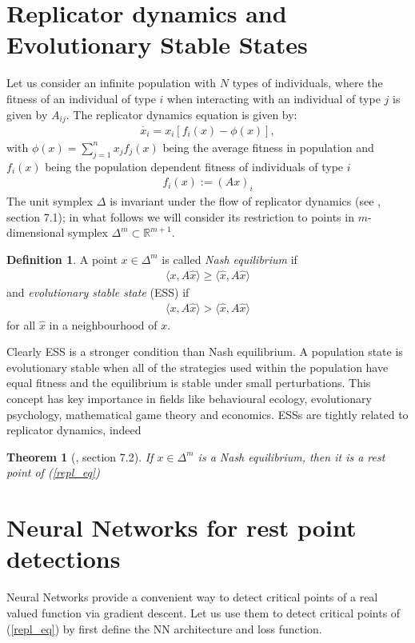 \documentclass[12pt,a4paper,twoside]{article}
\theoremstyle{plain}
\newtheorem{thm}{Theorem}
\theoremstyle{definition}
\newtheorem*{defin*}{Definition}
\theoremstyle{remark}
\begin{document}
\section*{Replicator dynamics and Evolutionary Stable States}
Let us consider an infinite population with $N$ types of individuals, where the fitness of an individual of type $i$ when interacting with an individual of type $j$ is given by $A_{ij}$.
The replicator dynamics equation is given by:
\begin{align}
\dot {x_i}=x_{i}[f_i(x)-\phi (x)], \label{repl_eq}\tag{RE}
\end{align}
with $\phi (x)=\sum _{j=1}^{n}{x_j f_j(x)}$ being the average fitness in population and $f_i(x)$
being the population dependent fitness of individuals of type $i$
\begin{align*}
f_i(x) := (Ax)_i
\end{align*}
The unit symplex $\Delta$ is invariant under the flow of replicator dynamics (see \cite{HS98}, section 7.1); in what follows we will consider its restriction to points in $m$-dimensional symplex $\Delta^m \subset \mathbb{R}^{m+1}$.


\begin{defin*}A point $x \in \Delta^m$ is called \textit{Nash equilibrium} if
\begin{align*}
\langle x, A \hat{x} \rangle \geq \langle \hat{x}, A\hat{x} \rangle
\end{align*}
and \textit{evolutionary stable state} (ESS) if
\begin{align*}
\langle x, A \hat{x} \rangle > \langle \hat{x}, A\hat{x} \rangle
\end{align*}
for all $\hat{x}$ in a neighbourhood of $x$. 
\end{defin*}
Clearly ESS is a stronger condition than Nash equilibrium. A population state is evolutionary stable  %
when all of the strategies used within the population have equal fitness and the equilibrium is stable under small perturbations. This concept has key importance in fields like behavioural ecology, evolutionary psychology, mathematical game theory and economics.
ESSs are tightly related to replicator dynamics, indeed  
\begin{thm}[\cite{HS98}, section 7.2] If $x \in \Delta^m$ is a Nash equilibrium, then it is a rest point of (\ref{repl_eq}) 
\end{thm}


\section*{Neural Networks for rest point detections}
Neural Networks provide a convenient way to detect critical points of a real valued function via gradient descent. Let us use them to detect critical points of (\ref{repl_eq}) by first define the NN architecture and loss function.
\end{document}
